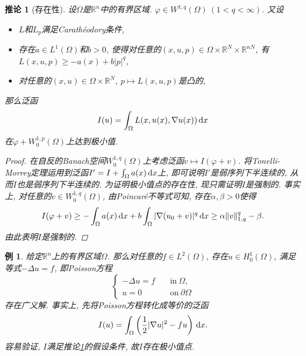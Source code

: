 \documentclass[12pt,a4paper]{article}
\newtheorem{example}[theorem]{例}
\newtheorem{corollary}[theorem]{推论}
\begin{document}
\begin{corollary}[存在性]\label{coro2.33}
    设$\Omega$是$\mathbb{R}^n$中的有界区域. $\varphi \in W^{1, q}(\Omega)\ (1 < q < \infty)$.
    又设 
    \begin{itemize}
        \item $L$和$L_p$满足Carathéodory条件,
        \item 存在$a \in L^1(\Omega)$和$b > 0$, 使得对任意的$(x, u, p) \in \Omega \times \mathbb{R}^N \times \mathbb{R}^{nN}$, 有$L(x, u, p) \geq -a(x) + b|p|^q$,
        \item 对任意的$(x, u) \in \Omega \times \mathbb{R}^N$, $p \mapsto L(x, u, p)$是凸的,
    \end{itemize}
    那么泛函 
    \begin{equation*}
        I(u) = \int_{\Omega}L(x, u(x), \nabla u(x)) \,{\rm d}x
    \end{equation*}
    在$\varphi + W_0^{1, p}(\Omega)$上达到极小值.
    \begin{proof}
        在自反的Banach空间$W_0^{1, q}(\Omega)$上考虑泛函$v \mapsto I(\varphi + v)$.
        将Tonelli-Morrey定理运用到泛函$I' = I + \int_{\Omega}a(x) \,{\rm d}x$上, 即可说明$I'$是弱序列下半连续的, 从而$I$也是弱序列下半连续的.
        为证明极小值点的存在性, 现只需证明$I$是强制的. 事实上, 对任意的$v \in W_0^{1, q}(\Omega)$, 由Poincaré不等式可知, 存在$\alpha, \beta > 0$使得 
        \begin{equation*}
            I(\varphi + v) \geq -\int_{\Omega}a(x) \,{\rm d}x + b\int_{\Omega}|\nabla (u_0 + v)|^q \,{\rm d}x \geq \alpha\Vert v \Vert_{1, q}^q - \beta.
        \end{equation*}
        由此表明$I$是强制的.
    \end{proof}
\end{corollary}

\begin{example}
    给定$\mathbb{R}^n$上的有界区域$\Omega$. 那么对任意的$f \in L^2(\Omega)$, 存在$u \in H_0^1(\Omega)$, 满足等式$-\Delta u = f$, 即Poisson方程
    \begin{equation*}
        \begin{cases}
            -\Delta u = f \quad &\text{in}\ \Omega, \\ 
            u = 0 \quad &\text{on}\ \partial\Omega
        \end{cases}
    \end{equation*}
    存在广义解. 事实上, 先将Poisson方程转化成等价的泛函 
    \begin{equation*}
        I(u) = \int_{\Omega}\left(\frac{1}{2}|\nabla u|^2 - fu\right) \,{\rm d}x.
    \end{equation*}
    容易验证, $I$满足推论\ref{coro2.33}的假设条件, 故$I$存在极小值点.
\end{example}
\end{document}
